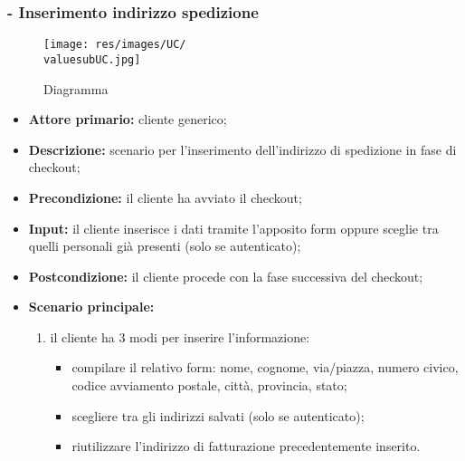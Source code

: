 \stepsubUserCase
\subsubsection{ - Inserimento indirizzo spedizione}
\begin{figure}[H]
    \centering
    \texttt{[image: res/images/UC/\\valuesubUC.jpg]}
    \caption{Diagramma }
\end{figure}
\begin{itemize}
    \item \textbf{Attore primario:} cliente generico;
    \item \textbf{Descrizione:} scenario per l'inserimento dell'indirizzo di spedizione in fase di checkout;
    \item \textbf{Precondizione:} il cliente ha avviato il checkout;
    \item \textbf{Input:} il cliente inserisce i dati tramite l'apposito form oppure sceglie tra quelli personali già presenti (solo se autenticato);
    \item \textbf{Postcondizione:} il cliente procede con la fase successiva del checkout;
    \item \textbf{Scenario principale:}
          \begin{enumerate}
              \item il cliente ha 3 modi per inserire l'informazione:
                    \begin{itemize}
                        \item compilare il relativo form: nome, cognome, via/piazza, numero civico, codice avviamento postale, città, provincia, stato;
                        \item scegliere tra gli indirizzi salvati (solo se autenticato);
                        \item riutilizzare l'indirizzo di fatturazione precedentemente inserito.
                    \end{itemize}
          \end{enumerate}
\end{itemize}

\stepsubUserCase
